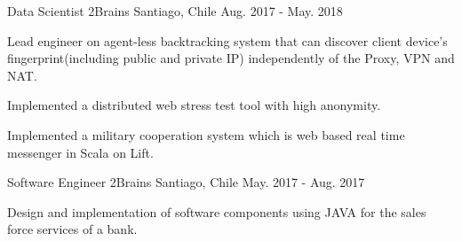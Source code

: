 \begin{cventries}
  \cventry
    {Data Scientist} %
    {2Brains} %
    {Santiago, Chile} %
    {Aug. 2017 - May. 2018} %
    {
      \begin{cvitems} %
        \item {Lead engineer on agent-less backtracking system that can discover client device's fingerprint(including public and private IP) independently of the Proxy, VPN and NAT.}
        \item {Implemented a distributed web stress test tool with high anonymity.}
        \item {Implemented a military cooperation system which is web based real time messenger in Scala on Lift.}
      \end{cvitems}
    }

  \cventry
    {Software Engineer} %
    {2Brains} %
    {Santiago, Chile} %
    {May. 2017 - Aug. 2017} %
    {
      \begin{cvitems} %
        \item {Design and implementation of software components using JAVA for the sales force services of a bank.}
      \end{cvitems}
    }


\end{cventries}
